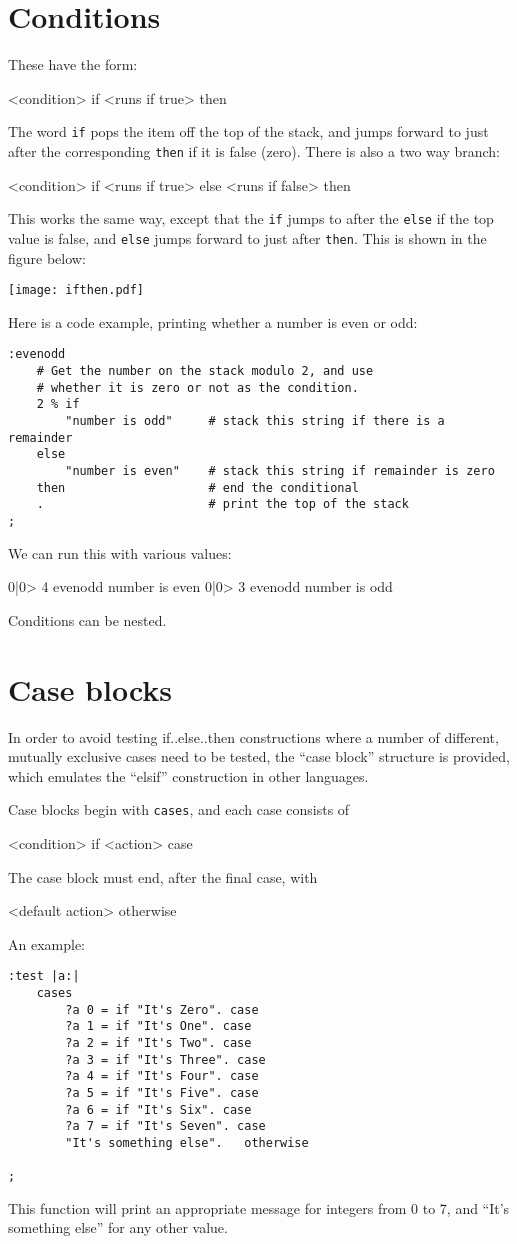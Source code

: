 \section{Conditions}
These have the form:
\begin{v}
<condition> if <runs if true> then
\end{v}
The word \texttt{if} pops the item off the top of the stack,
and jumps forward to just after the corresponding \texttt{then} if it is false (zero).
There is also a two way branch:
\begin{v}
<condition> if <runs if true> else <runs if false> then
\end{v}
This works the same way, except that the \texttt{if} jumps to after the
\texttt{else} if the top value is false, and \texttt{else} jumps forward
to just after \texttt{then}. This is shown in the figure below:
\begin{center}
\texttt{[image: ifthen.pdf]}
\end{center}
Here is a code example, printing whether a number is even or odd:
\begin{lstlisting}
:evenodd 
    # Get the number on the stack modulo 2, and use
    # whether it is zero or not as the condition.
    2 % if
        "number is odd"     # stack this string if there is a remainder
    else
        "number is even"    # stack this string if remainder is zero
    then                    # end the conditional
    .                       # print the top of the stack
;
\end{lstlisting}
We can run this with various values:
\begin{v}
0|0> 4 evenodd
number is even
0|0> 3 evenodd
number is odd
\end{v}
Conditions can be nested.
\section{Case blocks}
In order to avoid testing if..else..then constructions where a number of
different, mutually exclusive cases need to be tested, the ``case block''
structure is provided, which emulates the ``elsif'' construction in other
languages.

Case blocks begin with \texttt{cases}, and each case consists
of 
\begin{v}
    <condition> if <action> case
\end{v}
The case block must end, after the final case, with
\begin{v}
    <default action> otherwise
\end{v}
An example:
\begin{lstlisting}
:test |a:|
    cases
        ?a 0 = if "It's Zero". case
        ?a 1 = if "It's One". case
        ?a 2 = if "It's Two". case
        ?a 3 = if "It's Three". case
        ?a 4 = if "It's Four". case
        ?a 5 = if "It's Five". case
        ?a 6 = if "It's Six". case
        ?a 7 = if "It's Seven". case
        "It's something else".   otherwise
    
;
\end{lstlisting}
This function will print an appropriate message for integers from 0 to 7,
and ``It's something else'' for any other value.

